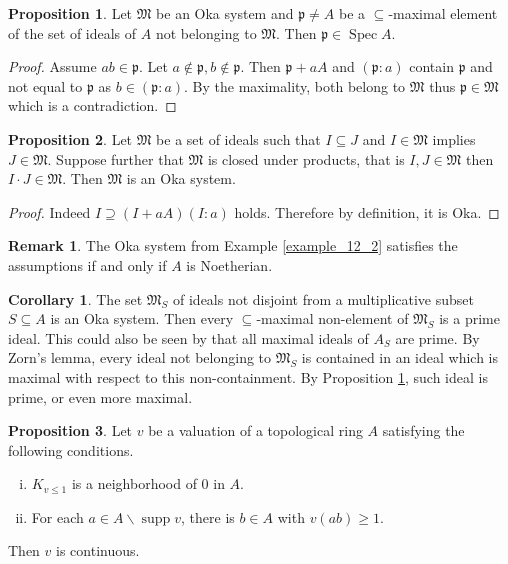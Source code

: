 \documentclass[10pt]{article}
\numberwithin{equation}{section}
\theoremstyle{definition}
\newtheorem{proposition}{Proposition}[subsection]
\newtheorem{remark}{Remark}[subsection]
\newtheorem{corollary}{Corollary} [subsection]
\DeclareMathOperator{\supp}{supp}
\DeclareMathOperator{\Spec}{Spec}
\newcommand{\p}[0]{\mathfrak{p}}
\begin{document}
\begin{proposition}
    \label{proposition_12_1}
    Let $\mathfrak{M}$ be an Oka system and $\p\not=A$ be a $\subseteq$-maximal element of the set of ideals of $A$ not belonging to $\mathfrak{M}$. Then $\p\in\Spec A$.
\end{proposition}
\begin{proof}
    Assume $ab\in\p$. Let $a\not\in \p,b\not\in\p$. Then $\p+aA$ and $(\p:a)$
    contain $\p$ and not equal to $\p$ as $b\in(\p:a)$. By the maximality, both belong to $\mathfrak{M}$ thus $\p\in\mathfrak{M}$ which is a contradiction.
\end{proof}
\begin{proposition}
    \label{fact_12_3}
    Let $\mathfrak{M}$ be a set of ideals such that $I\subseteq J$ and $I\in\mathfrak{M}$ implies $J\in\mathfrak{M}$. Suppose further that $\mathfrak{M}$ is closed under products, that is $I,J\in\mathfrak{M}$ then $I\cdot J\in\mathfrak{M}$. Then $\mathfrak{M}$ is an Oka system.
\end{proposition}
\begin{proof}
    Indeed $I\supseteq (I+aA)(I:a)$ holds. Therefore by definition, it is Oka.
\end{proof}
\begin{remark}
    The Oka system from Example \ref{example_12_2} satisfies the assumptions if and only if $A$ is Noetherian.
\end{remark}
\begin{corollary}
    \label{corollary_12_3}
    The set $\mathfrak{M}_S$ of ideals not disjoint from a multiplicative subset $S\subseteq A$ is an Oka system. Then every $\subseteq$-maximal non-element of $\mathfrak{M}_S$ is a prime ideal. This could also be seen by that all maximal ideals of $A_S$ are prime. By Zorn's lemma, every ideal not belonging to $\mathfrak{M}_S$ is contained in an ideal which is maximal with respect to this non-containment.
    By Proposition \ref{proposition_12_1}, such ideal is prime, or even more maximal.
\end{corollary}
\begin{proposition}
    \label{fact_12_4}
    Let $v$ be a valuation of a topological ring $A$ satisfying the following conditions.
    \begin{enumerate}[i.]
    \item $K_{v\leq 1}$ is a neighborhood of $0$ in $A$.
    \item For each $a\in A\backslash\supp v$, there is $b\in A$ with $v(ab)\geq1$.
    \end{enumerate}
    Then $v$ is continuous.
\end{proposition}
\end{document}

